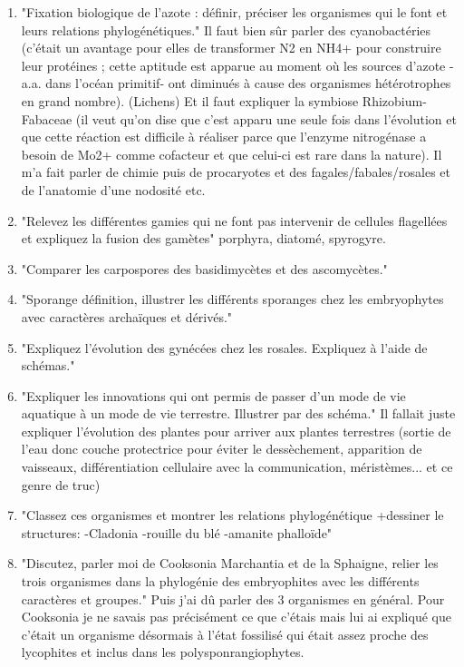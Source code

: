 \begin{enumerate}
	\item "Fixation biologique de l'azote : définir, préciser les organismes qui le font et leurs relations phylogénétiques." Il faut bien sûr parler des cyanobactéries (c'était un avantage pour elles de transformer N2 en NH4+ pour construire leur protéines ; cette aptitude est apparue au moment où les sources d'azote -a.a. dans l'océan primitif- ont diminués à cause des organismes hétérotrophes en grand nombre). (Lichens) Et il faut expliquer la symbiose Rhizobium-Fabaceae (il veut qu'on dise que c'est apparu une seule fois dans l'évolution et que cette réaction est difficile à réaliser parce que l'enzyme nitrogénase a besoin de Mo2+ comme cofacteur et que celui-ci est rare dans la nature). Il m'a fait parler de chimie puis de procaryotes et des fagales/fabales/rosales et de l'anatomie d'une nodosité etc.

	\item "Relevez les différentes gamies qui ne font pas intervenir de cellules flagellées et expliquez la fusion des gamètes"  porphyra, diatomé, spyrogyre.

	\item "Comparer les carpospores des basidimycètes et des ascomycètes."

	\item "Sporange définition, illustrer les différents sporanges chez les embryophytes avec caractères archaïques et dérivés."

	\item "Expliquez l'évolution des gynécées chez les rosales. Expliquez à l'aide de schémas."
	
	\item "Expliquer les innovations qui ont permis de passer d'un mode de vie aquatique à un mode de vie terrestre. Illustrer par des schéma." Il fallait juste expliquer l'évolution des plantes pour arriver aux plantes terrestres (sortie de l’eau donc couche protectrice pour éviter le dessèchement, apparition  de vaisseaux, différentiation cellulaire avec la communication, méristèmes... et ce genre de truc)

	\item "Classez ces organismes et montrer les relations phylogénétique +dessiner le structures:
-Cladonia
-rouille du blé
-amanite phalloïde"


	\item "Discutez, parler moi de Cooksonia Marchantia et de la Sphaigne, relier les trois organismes dans la phylogénie des embryophites avec les différents caractères et groupes." Puis j’ai dû parler des 3 organismes en général. Pour Cooksonia je ne savais pas précisément ce que c'étais mais lui ai expliqué que c'était un organisme désormais à l'état fossilisé qui était assez proche des lycophites et inclus dans les polysponrangiophytes.


\end{enumerate}
